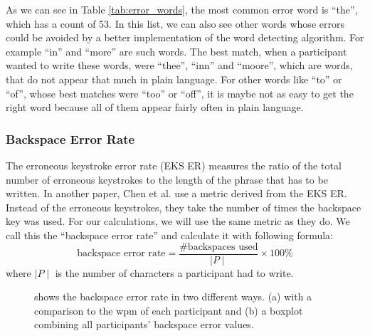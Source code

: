 As we can see in Table \ref{tab:error_words}, the most common error word is ``the'', which has a count of 53. In this list, we can also see other words whose errors could be avoided by a better implementation of the word detecting algorithm. For example ``in'' and ``more'' are such words. The best match, when a participant wanted to write these words, were ``thee'', ``inn'' and ``moore'', which are words, that do not appear that much in plain language. For other words like ``to'' or ``of'', whose best matches were ``too'' or ``off'', it is maybe not as easy to get the right word because all of them appear fairly often in plain language.

\subsubsection{Backspace Error Rate}
The erroneous keystroke error rate (EKS ER) \cite{ArifTextEntry} measures the ratio of the total number of erroneous keystrokes to the length of the phrase that has to be written. In another paper, Chen et al. \cite{10.1145/3290607.3312762} use a metric derived from the EKS ER. Instead of the erroneous keystrokes, they take the number of times the backspace key was used. For our calculations, we will use the same metric as they do. We call this the ``backspace error rate'' and calculate it with following formula:
\begin{equation}
    \text{backspace error rate} = \frac{\text{\#backspaces used}}{\mid P \mid} \times 100\%
\end{equation}
where $\mid P \mid$ is the number of characters a participant had to write.
\iffalse
\begin{figure}[H]
    \centering
    \vspace{2em}
    \caption{shows the backspace error rate in two different ways. (a) with a comparison to the wpm of each participant and (b) a boxplot combining all participants' backspace error values.}
    \label{fig:error_backspace}
\end{figure}
